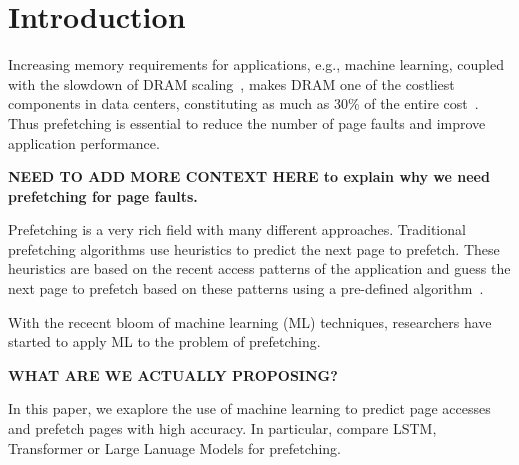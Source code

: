 \section{Introduction}
Increasing memory requirements for applications, e.g., machine learning, coupled with the slowdown of DRAM scaling~\cite{dram-1, dram-2}, makes DRAM one of the costliest components in data centers, constituting as much as 30\% of the entire cost~\cite{meta}. Thus prefetching is essential to reduce the number of page faults and improve application performance.

\textbf{NEED TO ADD MORE CONTEXT HERE to explain why we need prefetching for page faults.}




Prefetching is a very rich field with many different approaches. Traditional prefetching algorithms use heuristics to predict the next page to prefetch. These heuristics are based on the recent access patterns of the application and guess the next page to prefetch based on these patterns using a pre-defined algorithm~\cite{Markov, Survey}. 


With the rececnt bloom of machine learning (ML) techniques, researchers have started to apply ML to the problem of prefetching.

\textbf{WHAT ARE WE ACTUALLY PROPOSING?}

In this paper, we exaplore the use of machine learning to predict page accesses and prefetch pages with high accuracy. In particular, compare LSTM, Transformer or Large Lanuage Models for prefetching.